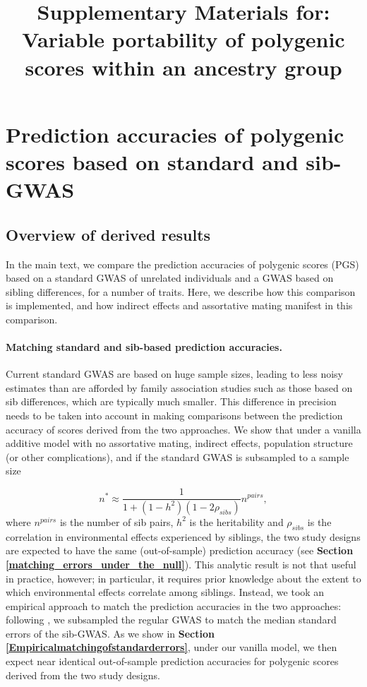 \documentclass[hidelinks, 12pt]{article}
\title{Supplementary Materials for: Variable portability of polygenic scores within an ancestry group}
\newcommand{\beginsupplement}{%
    \setcounter{table}{0}
    \renewcommand{\thetable}{S\arabic{table}}%
    \setcounter{figure}{0}
    \renewcommand{\thefigure}{S\arabic{figure}}%
}
\begin{document}
 
\baselineskip24pt

\maketitle 
\begin{center}
\end{center}
\clearpage

\begingroup
  \hypersetup{hidelinks}
  \tableofcontents
\endgroup

\listoftables
\listoffigures

\pagebreak

\beginsupplement

\section{Prediction accuracies of polygenic scores based on standard and sib-GWAS}
\subsection{Overview of derived results}
In the main text, we compare the prediction accuracies of polygenic scores (PGS) based on a standard GWAS of unrelated individuals and a GWAS based on sibling differences, for a number of traits. Here, we describe how this comparison is implemented, and how indirect effects and assortative mating manifest in this comparison.   

\paragraph{Matching standard and sib-based prediction accuracies.} Current standard GWAS are based on huge sample sizes, leading to less noisy estimates than are afforded by family association studies such as those based on sib differences, which are typically much smaller.  This difference in precision needs to be taken into account in making comparisons between the prediction accuracy of scores derived from the two approaches.  We show that under a vanilla additive model with no assortative mating, indirect effects, population structure (or other complications), and if the standard GWAS is subsampled to a sample size 

$$n^* \approx \frac{1}{1+(1-h^2)(1-2\rho_{sibs})}n^{pairs},$$
where $n^{pairs}$ is the number of sib pairs, $h^2$ is the heritability and $\rho_{sibs}$ is the correlation in environmental effects experienced by siblings, the two study designs are expected to have the same (out-of-sample) prediction accuracy (see {\bf Section \ref{matching_errors_under_the_null}}).  This analytic result is not that useful in practice, however; in particular, it requires prior knowledge about the extent to which environmental effects correlate among siblings.  Instead, we took an empirical approach to match the prediction accuracies in the two approaches: following  \cite{wood2014defining}, we subsampled the regular GWAS to match the median standard errors of the sib-GWAS.  As we show in {\bf Section \ref{Empiricalmatchingofstandarderrors}}, under our vanilla model, we then expect near identical out-of-sample prediction accuracies for polygenic scores derived from the two study designs.  
\end{document}
